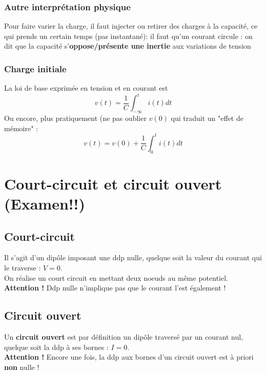 \documentclass	[11pt, a4paper, openany]{book}
\begin{document}
\subsubsection{Autre interprétation physique}
Pour faire varier la charge, il faut injecter ou retirer des charges à la capacité, ce qui prends un certain temps (pas instantané): il faut qu'un courant circule : on dit que la capacité s'\textbf{oppose/présente une inertie} aux variations de tension

\subsubsection{Charge initiale}
La loi de base exprimée en tension et en courant est 
\begin{equation}
v(t) = \frac{1}{C} \int_{-\infty}^t i(t) dt
\end{equation}
Ou encore, plus pratiquement (ne pas oublier $v(0)$ qui traduit un "effet de mémoire" :
\begin{equation}
v(t) = v(0) + \frac{1}{C} \int_0^t i(t) dt
\end{equation}







\setcounter{section}{6}
\section{Court-circuit et circuit ouvert (Examen!!)}
\subsection{Court-circuit}
Il s'agit d'un dipôle imposant une ddp nulle, quelque soit la valeur du courant qui le traverse : $V = 0$.\\ On réalise un court circuit en mettant deux noeuds au même potentiel.
\textbf{Attention !} Ddp nulle n'implique pas que le courant l'est également !

\subsection{Circuit ouvert}
Un \textbf{circuit ouvert} est par définition un dipôle traversé par un courant nul, quelque soit la ddp à ses bornes : $I =0$.\\
\textbf{Attention !} Encore une fois, la ddp aux bornes d'un circuit ouvert est à priori \textbf{non} nulle !

\setcounter{section}{8}
\end{document}
